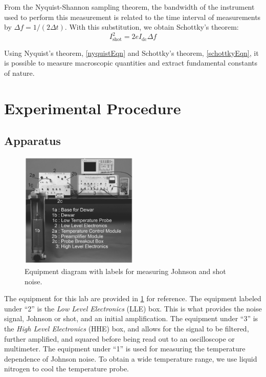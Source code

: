 \documentclass[12pt]{article}
\begin{document}
	From the Nyquist-Shannon sampling theorem, the bandwidth of the instrument used to perform this measurement is related to the time interval of measurements by $\Delta f = 1/(2 \Delta t)$. With this substitution, we obtain Schottky's theorem:
	\begin{equation}
		I^2_{\text{shot}} = 2eI_{\text{dc}} \Delta f
		\label{schottkyEqn}
	\end{equation}
	
	Using Nyquist's theorem, \cref{nyquistEqn} and Schottky's theorem, \cref{schottkyEqn}, it is possible to measure macroscopic quantities and extract fundamental constants of nature.

	\pagebreak
	
	\section{Experimental Procedure}
	
	\subsection{Apparatus}
	
	\begin{figure}
		\includegraphics[width=0.5\textwidth]{Apparatus.PNG}
		\caption{Equipment diagram with labels for measuring Johnson and shot noise.}
		\label{apparatus}
	\end{figure}

	The equipment for this lab are provided in \cref{apparatus} for reference. The equipment labeled under ``2'' is the \emph{Low Level Electronics} (LLE) box. This is what provides the noise signal, Johnson or shot, and an initial amplification. The equipment under ``3'' is the \emph{High Level Electronics} (HHE) box, and allows for the signal to be filtered, further amplified, and squared before being read out to an oscilloscope or multimeter. The equipment under ``1'' is used for measuring the temperature dependence of Johnson noise. To obtain a wide temperature range, we use liquid nitrogen to cool the temperature probe. 
		
\end{document}
